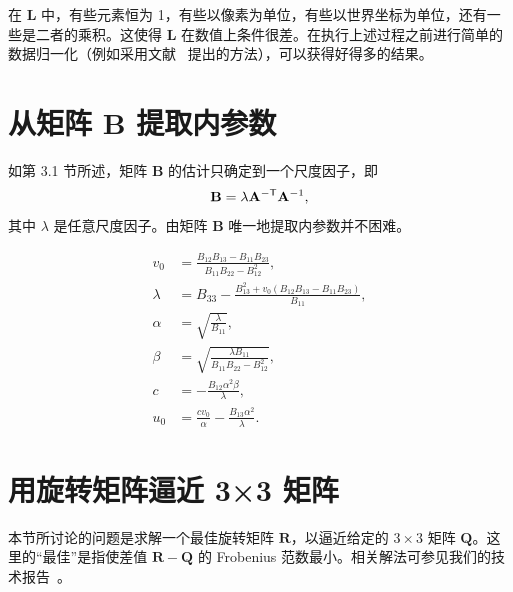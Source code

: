在 $\mathbf L$ 中，有些元素恒为 1，有些以像素为单位，有些以世界坐标为单位，还有一些是二者的乘积。这使得 $\mathbf L$ 在数值上条件很差。在执行上述过程之前进行简单的数据归一化（例如采用文献~\cite{hartley1995defence} 提出的方法），可以获得好得多的结果。

\section{从矩阵 B 提取内参数}

如第 3.1 节所述，矩阵 $\mathbf B$ 的估计只确定到一个尺度因子，即
\begin{equation*}
    \mathbf B=\lambda\mathbf A^{-\mathsf{T}}\mathbf A^{-1},
\end{equation*}
其中 $\lambda$ 是任意尺度因子。由矩阵 $\mathbf B$ 唯一地提取内参数并不困难。

\begin{align*}
    v_0
    &=\frac{B_{12}B_{13}-B_{11}B_{23}}
            {B_{11}B_{22}-B_{12}^{2}},\\
    \lambda
    &=B_{33}-\frac{B_{13}^{2}+v_0(B_{12}B_{13}-B_{11}B_{23})}
                         {B_{11}},\\
    \alpha&=\sqrt{\frac{\lambda}{B_{11}}},\\
    \beta&=\sqrt{\frac{\lambda B_{11}}
                         {B_{11}B_{22}-B_{12}^{2}}},\\
    c&=-\frac{B_{12}\alpha^{2}\beta}{\lambda},\\
    u_0&=\frac{cv_0}{\alpha}-\frac{B_{13}\alpha^{2}}{\lambda}.
\end{align*}

\section{用旋转矩阵逼近 3×3 矩阵}

本节所讨论的问题是求解一个最佳旋转矩阵 $\mathbf R$，以逼近给定的 $3\times3$ 矩阵 $\mathbf Q$。这里的“最佳”是指使差值 $\mathbf R-\mathbf Q$ 的 Frobenius 范数最小。相关解法可参见我们的技术报告~\cite{zhang1998flexible}。
